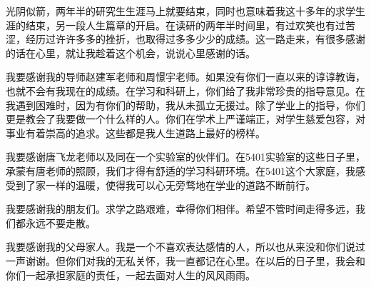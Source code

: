 
\begin{thanks}
光阴似箭，两年半的研究生生涯马上就要结束，同时也意味着我这十多年的求学生涯的结束，另一段人生篇章的开启。在读研的两年半时间里，有过欢笑也有过苦涩，经历过许许多多的挫折，也取得过多多少少的成绩。这一路走来，有很多感谢的话在心里，就让我趁着这个机会，说说心里感谢的话。

我要感谢我的导师赵建军老师和周憬宇老师。如果没有你们一直以来的谆谆教诲，也就不会有我现在的成绩。在学习和科研上，你们给了我非常珍贵的指导意见。在我遇到困难时，因为有你们的帮助，我从未孤立无援过。除了学业上的指导，你们更是教会了我要做一个什么样的人。你们在学术上严谨端正，对学生慈爱包容，对事业有着崇高的追求。这些都是我人生道路上最好的榜样。

我要感谢唐飞龙老师以及同在一个实验室的伙伴们。在5401实验室的这些日子里，承蒙有唐老师的照顾，我们才得有舒适的学习科研环境。在5401这个大家庭，我感受到了家一样的温暖，使得我可以心无旁骛地在学业的道路不断前行。

我要感谢我的朋友们。求学之路艰难，幸得你们相伴。希望不管时间走得多远，我们都永远不要走散。

我要感谢我的父母家人。我是一个不喜欢表达感情的人，所以也从来没和你们说过一声谢谢。但你们对我的无私关怀，我一直都记在心里。在以后的日子里，我会和你们一起承担家庭的责任，一起去面对人生的风风雨雨。

\end{thanks}
